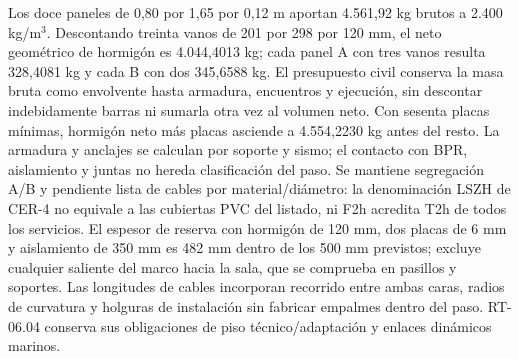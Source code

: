 Los doce paneles de 0,80 por 1,65 por 0,12 m aportan 4.561,92 kg brutos a 2.400 kg/m$^3$. Descontando treinta vanos de 201 por 298 por 120 mm, el neto geométrico de hormigón es 4.044,4013 kg; cada panel A con tres vanos resulta 328,4081 kg y cada B con dos 345,6588 kg. El presupuesto civil conserva la masa bruta como envolvente hasta armadura, encuentros y ejecución, sin descontar indebidamente barras ni sumarla otra vez al volumen neto. Con sesenta placas mínimas, hormigón neto más placas asciende a 4.554,2230 kg antes del resto. La armadura y anclajes se calculan por soporte y sismo; el contacto con BPR, aislamiento y juntas no hereda clasificación del paso. Se mantiene segregación A/B y pendiente lista de cables por material/diámetro: la denominación LSZH de CER-4 no equivale a las cubiertas PVC del listado, ni F2h acredita T2h de todos los servicios. El espesor de reserva con hormigón de 120 mm, dos placas de 6 mm y aislamiento de 350 mm es 482 mm dentro de los 500 mm previstos; excluye cualquier saliente del marco hacia la sala, que se comprueba en pasillos y soportes. Las longitudes de cables incorporan recorrido entre ambas caras, radios de curvatura y holguras de instalación sin fabricar empalmes dentro del paso. RT-06.04 conserva sus obligaciones de piso técnico/adaptación y enlaces dinámicos marinos.
